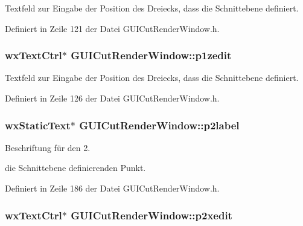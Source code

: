 Textfeld zur Eingabe der Position des Dreiecks, dass die Schnittebene definiert. 



Definiert in Zeile 121 der Datei G\-U\-I\-Cut\-Render\-Window.\-h.

\hypertarget{classGUICutRenderWindow_a5843efcb13e1d56ea95932d052e5666a}{
\subsubsection[{p1zedit}]{\setlength{\rightskip}{0pt plus 5cm}wx\-Text\-Ctrl$\ast$ G\-U\-I\-Cut\-Render\-Window\-::p1zedit\hspace{0.3cm}{\ttfamily [private]}}}\label{classGUICutRenderWindow_a5843efcb13e1d56ea95932d052e5666a}


Textfeld zur Eingabe der Position des Dreiecks, dass die Schnittebene definiert. 



Definiert in Zeile 126 der Datei G\-U\-I\-Cut\-Render\-Window.\-h.

\hypertarget{classGUICutRenderWindow_adc1202b42f220ea7b8a8830f4d9d322a}{
\subsubsection[{p2label}]{\setlength{\rightskip}{0pt plus 5cm}wx\-Static\-Text$\ast$ G\-U\-I\-Cut\-Render\-Window\-::p2label\hspace{0.3cm}{\ttfamily [private]}}}\label{classGUICutRenderWindow_adc1202b42f220ea7b8a8830f4d9d322a}


Beschriftung für den 2. 

die Schnittebene definierenden Punkt. 

Definiert in Zeile 186 der Datei G\-U\-I\-Cut\-Render\-Window.\-h.

\hypertarget{classGUICutRenderWindow_a5d2bcd96c6fdb8d629583c5d40ccdbcc}{
\subsubsection[{p2xedit}]{\setlength{\rightskip}{0pt plus 5cm}wx\-Text\-Ctrl$\ast$ G\-U\-I\-Cut\-Render\-Window\-::p2xedit\hspace{0.3cm}{\ttfamily [private]}}}\label{classGUICutRenderWindow_a5d2bcd96c6fdb8d629583c5d40ccdbcc}


